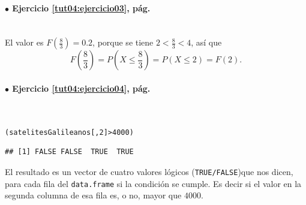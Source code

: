 \documentclass[10pt,a4paper]{article}\usepackage[]{graphicx}\usepackage[]{color}
\makeatletter
\newcommand{\hlnum}[1]{\textcolor[rgb]{0.686,0.059,0.569}{#1}}%
\newcommand{\hlopt}[1]{\textcolor[rgb]{0,0,0}{#1}}%
\newcommand{\hlstd}[1]{\textcolor[rgb]{0.345,0.345,0.345}{#1}}%
\newenvironment{kframe}{%
 \def\at@end@of@kframe{}%
 \ifinner\ifhmode%
  \def\at@end@of@kframe{\end{minipage}}%
  \begin{minipage}{\columnwidth}%
 \fi\fi%
 \def\FrameCommand##1{\hskip\@totalleftmargin \hskip-\fboxsep
 \colorbox{shadecolor}{##1}\hskip-\fboxsep
     \hskip-\linewidth \hskip-\@totalleftmargin \hskip\columnwidth}%
 \MakeFramed {\advance\hsize-\width
   \@totalleftmargin\z@ \linewidth\hsize
   \@setminipage}}%
 {\par\unskip\endMakeFramed%
 \at@end@of@kframe}
\newenvironment{knitrout}{}{} %
\makeatother
\begin{document}
\paragraph{\bf $\bullet$ Ejercicio \ref{tut04:ejercicio03}, pág. \pageref{tut04:ejercicio03}}
\label{tut04:ejercicio03:sol}\quad\\

El valor es $F(\frac{8}{3})=0.2$, porque se tiene $2<\frac{8}{3}<4$, así que
\[F(\frac{8}{3}) = P(X \leq \frac{8}{3}) = P(X\leq 2)=F(2).\]

\paragraph{\bf $\bullet$ Ejercicio \ref{tut04:ejercicio04}, pág. \pageref{tut04:ejercicio04}}
\label{tut04:ejercicio04:sol}\quad\\

\begin{knitrout}
\color{fgcolor}\begin{kframe}
\begin{alltt}
\hlstd{(satelitesGalileanos[ ,}\hlnum{2}\hlstd{]} \hlopt{>} \hlnum{4000}\hlstd{)}
\end{alltt}
\begin{verbatim}
## [1] FALSE FALSE  TRUE  TRUE
\end{verbatim}
\end{kframe}
\end{knitrout}
El resultado es un vector de cuatro valores lógicos ({\tt TRUE/FALSE})que nos dicen, para cada fila del {\tt data.frame} si la condición se cumple. Es decir si el valor en la segunda columna de esa fila es, o no, mayor que $4000$.
\end{document}
